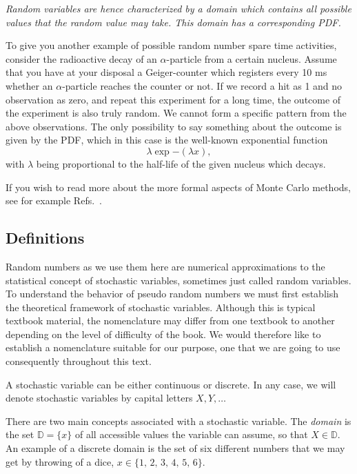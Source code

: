 {\em Random variables are hence characterized by a domain which contains all possible
values that the random value may take. This domain has a corresponding PDF.}

To give you another example of possible random number spare time activities, consider the radioactive
decay of an $\alpha$-particle from a certain nucleus. Assume that you have at your disposal
a Geiger-counter which registers every 10 ms whether an $\alpha$-particle reaches the 
counter or not. If we record a hit as 1 and no observation as zero, and repeat this
experiment for a long time, the outcome of the experiment is also truly random. We cannot
form a specific pattern from the above observations. The only possibility to say something
about the outcome is given by the PDF, which in this case is the well-known 
exponential function 
\[
   \lambda\exp{-(\lambda x)},
\]
with $\lambda$ being proportional to the half-life of the given nucleus which decays.  

If you wish to read more about the more formal aspects of Monte Carlo methods, 
see for example Refs.~\cite{robertcasella,johnson,fishman}.



\subsection{Definitions}

Random numbers as we use them here are numerical approximations to the
statistical concept of stochastic variables, sometimes just called
random variables. To understand the behavior of pseudo
random numbers we must first establish the theoretical framework of
stochastic variables. Although this is typical textbook material,
the nomenclature may differ from one textbook to another depending on
the level of difficulty of the book. We would therefore like to
establish a nomenclature suitable for our purpose, one that we are
going to use consequently throughout this text.

A stochastic variable can be either continuous or discrete. In any
case, we will denote stochastic variables by capital letters $X,
Y,\dots$

There are two main concepts associated with a stochastic variable. The
\emph{domain} is the set $\mathbb D = \{x\}$ of all accessible values
the variable can assume, so that $X \in \mathbb D$. An example of a
discrete domain is the set of six different numbers that we may get by
throwing of a dice, $x\in\{1,\,2,\,3,\,4,\,5,\,6\}$.


